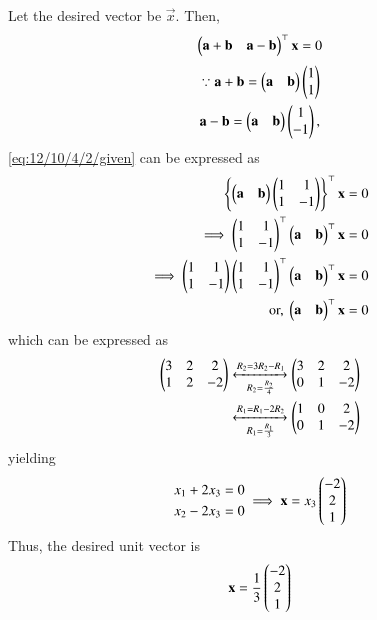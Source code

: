 Let the desired vector be $\vec{x}$.  Then, 
\begin{align} 
\begin{pmatrix}\mathbf{a}+\mathbf{b}& \mathbf{a}-\mathbf{b}\end{pmatrix}^\top\mathbf{x}=0\\
	\label{eq:12/10/4/2/given}
\end{align}
\begin{align}
	\because 
	\mathbf{a}+\mathbf{b}= \begin{pmatrix}\mathbf{a} & \mathbf{b}\end{pmatrix}\begin{pmatrix}1 \\ 1\end{pmatrix}
	\\
	\mathbf{a} - \mathbf{b}= \begin{pmatrix}\mathbf{a} & \mathbf{b}\end{pmatrix}\begin{pmatrix}1 \\ -1\end{pmatrix}, 
\end{align}
	\eqref{eq:12/10/4/2/given}
	can be expressed as 
\begin{align}
	\left\{\begin{pmatrix}\mathbf{a} & \mathbf{b}\end{pmatrix}\begin{pmatrix}1 & 1\\ 1 & -1\end{pmatrix}\right\}^\top\mathbf{x}=0\\
\implies 	\begin{pmatrix}1 & 1\\ 1 & -1\end{pmatrix}^\top\begin{pmatrix}\mathbf{a} & \mathbf{b}\end{pmatrix}^\top\mathbf{x}=0
\\
\implies 	\begin{pmatrix}1 & 1\\ 1 & -1\end{pmatrix}\begin{pmatrix}1 & 1\\ 1 & -1\end{pmatrix}^\top\begin{pmatrix}\mathbf{a} & \mathbf{b}\end{pmatrix}^\top\mathbf{x}=0
\\
	\text{or, }
\begin{pmatrix}\mathbf{a} & \mathbf{b}\end{pmatrix}^\top\mathbf{x}=0
\end{align}
which can be expressed as 
\begin{align} 
\begin{pmatrix}
3&2&2\\
1&2&-2
\end{pmatrix}
	\xleftrightarrow[R_2 = \frac{R_2}{4}]{R_2=3R_2-R_1}
\begin{pmatrix}
3&2&2\\
0&1&-2
	\end{pmatrix}
	\\
	\xleftrightarrow[R_1 = \frac{R_1}{3}]{R_1=R_1 - 2R_2}
\begin{pmatrix}
1&0&2\\
0&1&-2
\end{pmatrix}
\end{align}
yielding
\begin{align}
\begin{split}
x_1+2x_3=0\\
x_2-2x_3=0
\end{split}
\implies 
\mathbf{x}
=x_3\begin{pmatrix}-2\\2\\1\end{pmatrix}
\end{align}
Thus, the desired unit vector  is 
\begin{align}
\mathbf{x}
	=\frac{1}{3}\begin{pmatrix}-2\\2\\1\end{pmatrix}
\end{align}
